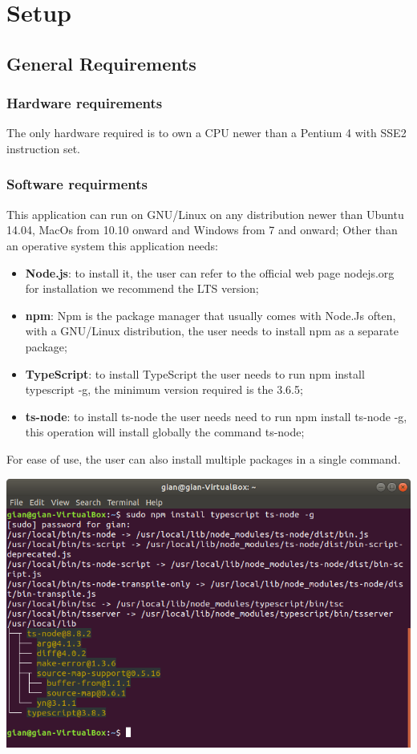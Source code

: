 \section{Setup}
\subsection{General Requirements}
\subsubsection{Hardware requirements}
The only hardware required is to own a CPU newer than a Pentium 4 with SSE2 instruction set.
\subsubsection{Software requirments}
This application can run on GNU/Linux on any distribution newer than Ubuntu 14.04, MacOs from 10.10 onward and Windows from 7 and onward;
Other than an operative system this application needs:
\begin{itemize}
    \item \textbf{Node.js}: to install it, the user can refer to the official web page nodejs.org for installation we recommend the LTS version;
    \item \textbf{npm}: Npm is the package manager that usually comes with Node.Js often, with a GNU/Linux distribution, the user needs to install npm as a separate package;
    \item \textbf{TypeScript}: to install TypeScript the user needs to run npm install typescript -g, the minimum version required is the 3.6.5;
    \item \textbf{ts-node}: to install ts-node the user needs need to run npm install ts-node -g, this operation will install globally the command ts-node;
\end{itemize}
For ease of use, the user can also install multiple packages in a single command.
\begin{center}
\end{center}
\includegraphics[width=\textwidth]{res/img/typescriptInstall.png}    




